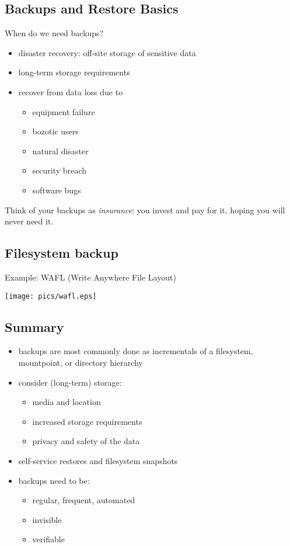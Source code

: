 \documentclass[xga]{xdvislides}
\begin{document}
\subsection{Backups and Restore Basics}
When do we need backups?
\begin{itemize}
	\item disaster recovery: off-site storage of sensitive data
	\item long-term storage requirements
	\item recover from data loss due to
		\begin{itemize}
			\item equipment failure
			\item bozotic users
			\item natural disaster
			\item security breach
			\item software bugs
		\end{itemize}
\end{itemize}
\addvspace{.5in}
Think of your backups as {\em insurance}:  you invest and pay for it, hoping
you will never need it.

\subsection{Filesystem backup}
Example: WAFL (Write Anywhere File Layout)
\vspace*{\fill}
\begin{center}
	\texttt{[image: pics/wafl.eps]}
\end{center}
\vspace*{\fill}

\subsection{Summary}
\begin{itemize}
	\item backups are most commonly done as incrementals
		of a filesystem, mountpoint, or directory hierarchy
	\item consider (long-term) storage:
		\begin{itemize}
			\item media and location
			\item increased storage requirements
			\item privacy and safety of the data
		\end{itemize}
	\item self-service restores and filesystem snapshots
	\item backups need to be:
		\begin{itemize}
			\item regular, frequent, automated
			\item invisible
			\item verifiable
		\end{itemize}
\end{itemize}
\end{document}
